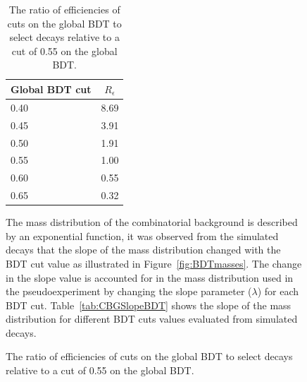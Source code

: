 \begin{figure}[tbp]
{\begin{table}[htbp]
\begin{center}
\begin{tabular}{lc}
\hline
Global BDT cut & $R_{\epsilon}$ \\ \hline 
0.40 & 8.69 \\
0.45 & 3.91 \\
0.50 & 1.91 \\
0.55 & 1.00 \\
0.60 & 0.55 \\
0.65 & 0.32 \\ \hline
\end{tabular}
\vspace{0.7cm}

\caption{The ratio of efficiencies of cuts on the global BDT to select \bbbarmumux decays relative to a cut of 0.55 on the global BDT. }
\label{tab:EfficiencyRatioCombBG}
\end{center}
\vspace{-1.0cm}
\end{table}


The mass distribution of the combinatorial background is described by an exponential function, it was observed from the simulated \bbbarmumux decays that the slope of the mass distribution changed with the BDT cut value as illustrated in Figure~\ref{fig:BDTmasses}. The change in the slope value is accounted for in the mass distribution used in the pseudoexperiment by changing the slope parameter ($\lambda$) for each BDT cut. Table~\ref{tab:CBGSlopeBDT} shows the slope of the mass distribution for different BDT cuts values evaluated from \bbbarmumux simulated decays.

}
\end{figure}
